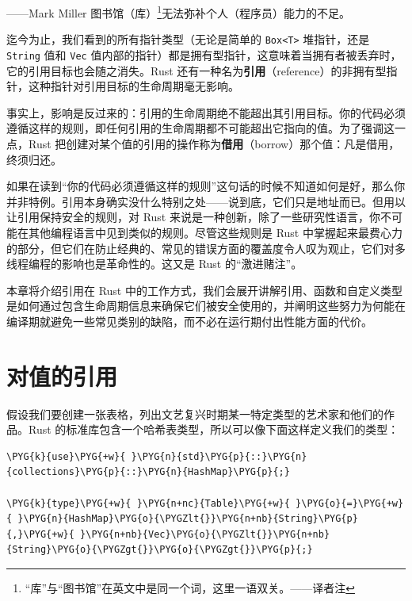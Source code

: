 
\begin{myEpigraph}{——Mark Miller}
图书馆（库）\footnote{“库”与“图书馆”在英文中是同一个词，这里一语双关。——译者注}无法弥补个人（程序员）能力的不足。
\end{myEpigraph}

迄今为止，我们看到的所有指针类型（无论是简单的 \texttt{Box<T>} 堆指针，还是 \texttt{String} 值和 \texttt{Vec} 值内部的指针）都是拥有型指针，这意味着当拥有者被丢弃时，它的引用目标也会随之消失。Rust 还有一种名为\textbf{引用}（reference）的非拥有型指针，这种指针对引用目标的生命周期毫无影响。

事实上，影响是反过来的：引用的生命周期绝不能超出其引用目标。你的代码必须遵循这样的规则，即任何引用的生命周期都不可能超出它指向的值。为了强调这一点，Rust 把创建对某个值的引用的操作称为\textbf{借用}（borrow）那个值：凡是借用，终须归还。

如果在读到“你的代码必须遵循这样的规则”这句话的时候不知道如何是好，那么你并非特例。引用本身确实没什么特别之处——说到底，它们只是地址而已。但用以让引用保持安全的规则，对 Rust 来说是一种创新，除了一些研究性语言，你不可能在其他编程语言中见到类似的规则。尽管这些规则是 Rust 中掌握起来最费心力的部分，但它们在防止经典的、常见的错误方面的覆盖度令人叹为观止，它们对多线程编程的影响也是革命性的。这又是 Rust 的“激进赌注”。

本章将介绍引用在 Rust 中的工作方式，我们会展开讲解引用、函数和自定义类型是如何通过包含生命周期信息来确保它们被安全使用的，并阐明这些努力为何能在编译期就避免一些常见类别的缺陷，而不必在运行期付出性能方面的代价。

\section{对值的引用}

假设我们要创建一张表格，列出文艺复兴时期某一特定类型的艺术家和他们的作品。Rust 的标准库包含一个哈希表类型，所以可以像下面这样定义我们的类型：

\begin{Verbatim}[commandchars=\\\{\},breaklines=true,breakanywhere=true,fontsize=\codefont,xleftmargin=17bp]
\PYG{k}{use}\PYG{+w}{ }\PYG{n}{std}\PYG{p}{::}\PYG{n}{collections}\PYG{p}{::}\PYG{n}{HashMap}\PYG{p}{;}

\PYG{k}{type}\PYG{+w}{ }\PYG{n+nc}{Table}\PYG{+w}{ }\PYG{o}{=}\PYG{+w}{ }\PYG{n}{HashMap}\PYG{o}{\PYGZlt{}}\PYG{n+nb}{String}\PYG{p}{,}\PYG{+w}{ }\PYG{n+nb}{Vec}\PYG{o}{\PYGZlt{}}\PYG{n+nb}{String}\PYG{o}{\PYGZgt{}}\PYG{o}{\PYGZgt{}}\PYG{p}{;}
\end{Verbatim}

